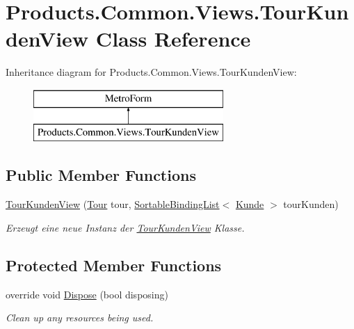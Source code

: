 \hypertarget{class_products_1_1_common_1_1_views_1_1_tour_kunden_view}{}\section{Products.\+Common.\+Views.\+Tour\+Kunden\+View Class Reference}
\label{class_products_1_1_common_1_1_views_1_1_tour_kunden_view}
Inheritance diagram for Products.\+Common.\+Views.\+Tour\+Kunden\+View\+:\begin{figure}[H]
\begin{center}
\leavevmode
\includegraphics[height=2.000000cm]{class_products_1_1_common_1_1_views_1_1_tour_kunden_view}
\end{center}
\end{figure}
\subsection*{Public Member Functions}
\begin{DoxyCompactItemize}
\item 
\hyperlink{class_products_1_1_common_1_1_views_1_1_tour_kunden_view_a43995e6f48c34f86301e23bc08dab63d}{Tour\+Kunden\+View} (\hyperlink{class_products_1_1_model_1_1_entities_1_1_tour}{Tour} tour, \hyperlink{class_products_1_1_common_1_1_sortable_binding_list}{Sortable\+Binding\+List}$<$ \hyperlink{class_products_1_1_model_1_1_entities_1_1_kunde}{Kunde} $>$ tour\+Kunden)
\begin{DoxyCompactList}\small\item\em Erzeugt eine neue Instanz der \hyperlink{class_products_1_1_common_1_1_views_1_1_tour_kunden_view}{Tour\+Kunden\+View} Klasse. \end{DoxyCompactList}\end{DoxyCompactItemize}
\subsection*{Protected Member Functions}
\begin{DoxyCompactItemize}
\item 
override void \hyperlink{class_products_1_1_common_1_1_views_1_1_tour_kunden_view_acddf644e0bf2b2010a35f60046196888}{Dispose} (bool disposing)
\begin{DoxyCompactList}\small\item\em Clean up any resources being used. \end{DoxyCompactList}\end{DoxyCompactItemize}



